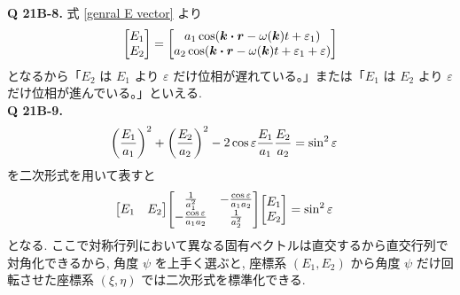 \documentclass[uplatex,a4paper,dvipdfmx]{jsarticle}
\theoremstyle{definition}
\begin{document}
\textbf{Q 21B-8.} 式 \eqref{genral E vector} より
\begin{align}
  \mqty[E_1 \\ E_2] = \mqty[a_1\cos(\kk\vdot\rr - \omega(\kk)t + \varepsilon_1) \\ a_2\cos(\kk\vdot\rr - \omega(\kk)t + \varepsilon_1 + \varepsilon)] \label{E12 phase}
\end{align}
となるから「$E_2$ は $E_1$ より $\varepsilon$ だけ位相が遅れている。」または「$E_1$ は $E_2$ より $\varepsilon$ だけ位相が進んでいる。」といえる. \\

\textbf{Q 21B-9.}
\begin{align}
  \qty(\frac{E_1}{a_1})^2 + \qty(\frac{E_2}{a_2})^2 - 2\cos\varepsilon\frac{E_1}{a_1}\frac{E_2}{a_2} & = \sin^2{\varepsilon}
\end{align}
を二次形式を用いて表すと
\begin{align}
  \mqty[E_1 & E_2]\mqty[\frac{1}{a_1^2} & -\frac{\cos\varepsilon}{a_1a_2} \\ -\frac{\cos\varepsilon}{a_1a_2} & \frac{1}{a_2^2}]\mqty[E_1 \\ E_2] & = \sin^2\varepsilon
\end{align}
となる. ここで対称行列において異なる固有ベクトルは直交するから直交行列で対角化できるから, 角度 $\psi$ を上手く選ぶと, 座標系 $(E_1, E_2)$ から角度 $\psi$ だけ回転させた座標系 $(\xi, \eta)$ では二次形式を標準化できる.
\end{document}
